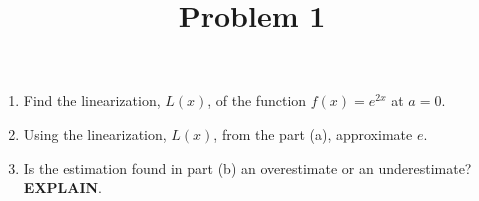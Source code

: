 \documentclass{ximera}
\title[Problem 1]{Problem 1}
\begin{document}
\begin{abstract} \end{abstract}
\maketitle

\begin{problem}

  \begin{enumerate}
    \item
      Find the linearization, $L(x)$, of the function $f(x) = e^{2x}$ at $a = 0$.
      \item
    Using the linearization, $L(x)$, from the part (a), approximate $e$.
      \item
    Is the estimation found in part (b) an overestimate or an underestimate? \textbf{EXPLAIN}.

  \end{enumerate}
\end{problem}
\end{document}
